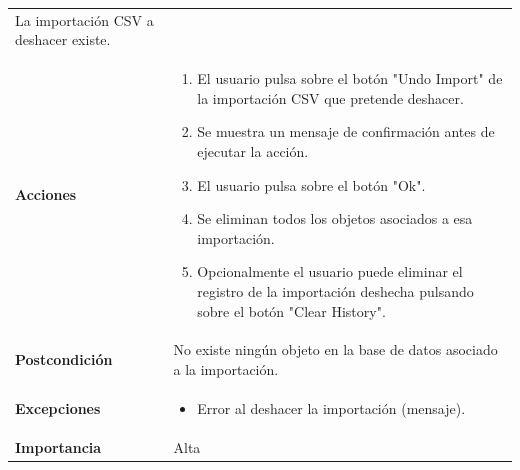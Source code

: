 \documentclass[
]{article}
\providecommand{\tightlist}{%
  \setlength{\itemsep}{0pt}\setlength{\parskip}{0pt}}
\begin{document}
\begin{longtable}[]{@{}ll@{}}
\begin{minipage}[t]{0.78\columnwidth}
La importación CSV a deshacer existe.\strut
\end{minipage}\tabularnewline
\begin{minipage}[t]{0.16\columnwidth}\raggedright
\textbf{Acciones}\strut
\end{minipage} & \begin{minipage}[t]{0.78\columnwidth}\raggedright
\begin{enumerate}
\def\labelenumi{\arabic{enumi}.}
\tightlist
\item
  El usuario pulsa sobre el botón "Undo Import" de la importación CSV
  que pretende deshacer.
\item
  Se muestra un mensaje de confirmación antes de ejecutar la acción.
\item
  El usuario pulsa sobre el botón "Ok".
\item
  Se eliminan todos los objetos asociados a esa importación.
\item
  Opcionalmente el usuario puede eliminar el registro de la importación
  deshecha pulsando sobre el botón "Clear History".
\end{enumerate}\strut
\end{minipage}\tabularnewline
\begin{minipage}[t]{0.16\columnwidth}\raggedright
\textbf{Postcondición}\strut
\end{minipage} & \begin{minipage}[t]{0.78\columnwidth}\raggedright
No existe ningún objeto en la base de datos asociado a la
importación.\strut
\end{minipage}\tabularnewline
\begin{minipage}[t]{0.16\columnwidth}\raggedright
\textbf{Excepciones}\strut
\end{minipage} & \begin{minipage}[t]{0.78\columnwidth}\raggedright
\begin{itemize}
\tightlist
\item
  Error al deshacer la importación (mensaje).
\end{itemize}\strut
\end{minipage}\tabularnewline
\begin{minipage}[t]{0.16\columnwidth}\raggedright
\textbf{Importancia}\strut
\end{minipage} & \begin{minipage}[t]{0.78\columnwidth}\raggedright
Alta\strut
\end{minipage}\tabularnewline
\bottomrule
\end{longtable}
\end{document}
